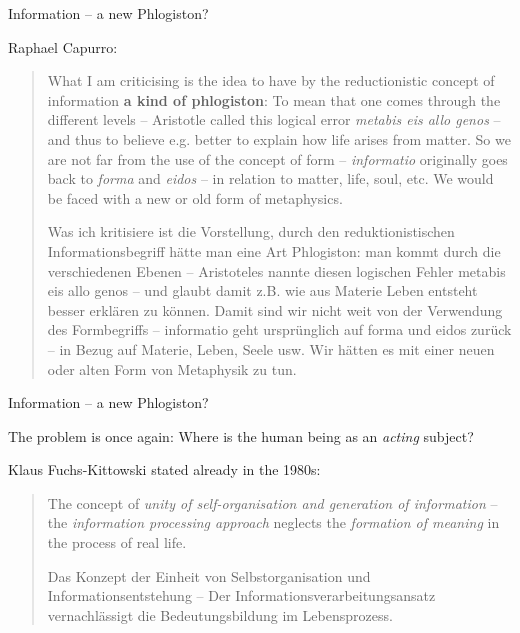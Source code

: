 \documentclass{beamer}
\begin{document}
\begin{frame}{Information -- a new Phlogiston?}

Raphael Capurro:\vfill
\begin{quote}\scriptsize
  What I am criticising is the idea to have by the reductionistic concept of
  information \textbf{a kind of phlogiston}: To mean that one comes through
  the different levels -- Aristotle called this logical error \emph{metabis
    eis allo genos} -- and thus to believe e.g. better to explain how life
  arises from matter. So we are not far from the use of the concept of form --
  \emph{informatio} originally goes back to \emph{forma} and \emph{eidos} --
  in relation to matter, life, soul, etc. We would be faced with a new or old
  form of metaphysics.\bigskip

  Was ich kritisiere ist die Vorstellung, durch den reduktionistischen
  Informationsbegriff hätte man eine Art Phlogiston: man kommt durch die
  verschiedenen Ebenen – Aristoteles nannte diesen logischen Fehler metabis
  eis allo genos – und glaubt damit z.B. wie aus Materie Leben entsteht besser
  erklären zu können. Damit sind wir nicht weit von der Verwendung des
  Formbegriffs – informatio geht ursprünglich auf forma und eidos zurück – in
  Bezug auf Materie, Leben, Seele usw. Wir hätten es mit einer neuen oder
  alten Form von Metaphysik zu tun.
\end{quote}
\end{frame}

\begin{frame}{Information -- a new Phlogiston?}

The problem is once again: Where is the human being as an \emph{acting}
subject?

Klaus Fuchs-Kittowski stated already in the 1980s:\bigskip

\begin{quote}\small
  The concept of \emph{unity of self-organisation and generation of
    information} -- the \emph{information processing approach} neglects the
  \emph{formation of meaning} in the process of real life.\bigskip

  Das Konzept der Einheit von Selbstorganisation und Informationsentstehung –
  Der Informationsverarbeitungsansatz vernachlässigt die Bedeutungsbildung im
  Lebensprozess.
\end{quote}\vspace*{1em}
\end{frame}
\end{document}
